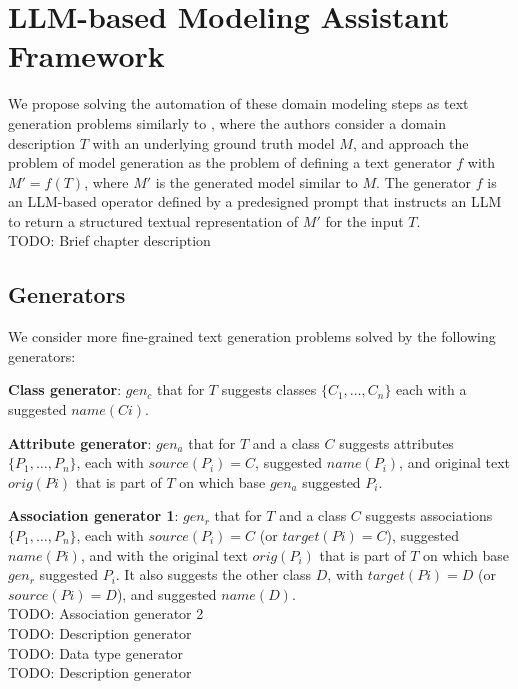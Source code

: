 \chapter{LLM-based Modeling Assistant Framework}

We propose solving the automation of these domain modeling steps as text generation problems similarly to \citet{Chen2023}, where the authors consider a domain description $T$ with an underlying ground truth model $M$, and approach the problem of model generation as the problem of defining a text generator $f$ with $M' = f(T)$, where $M'$ is the generated model similar to $M$. The generator $f$ is an LLM-based operator defined by a predesigned prompt that instructs an LLM to return a structured textual representation of $M'$ for the input $T$. \\

TODO: Brief chapter description


\section{Generators}

We consider more fine-grained text generation problems solved by the following generators:

\textbf{Class generator}: $gen_c$ that for $T$ suggests classes $\{C_1, \ldots, C_n\}$ each with a suggested $name(Ci)$.

\textbf{Attribute generator}: $gen_a$ that for $T$ and a class $C$ suggests attributes $\{P_1, \ldots, P_n\}$, each with $source(P_i) = C$, suggested $name(P_i)$, and original text $orig(Pi)$ that is part of $T$ on which base $gen_a$ suggested $P_i$.

\textbf{Association generator 1}: $gen_r$ that for $T$ and a class $C$ suggests associations $\{P_1, \ldots, P_n\}$, each with $source(P_i) = C$ (or $target(Pi) = C$), suggested $name(Pi)$, and with the original text $orig(P_i)$ that is part of $T$ on which base $gen_r$ suggested $P_i$. It also suggests the other class $D$, with $target(Pi)= D$ (or $source(Pi) = D$), and suggested $name(D)$. \\

TODO: Association generator 2 \\

TODO: Description generator \\

TODO: Data type generator \\

TODO: Description generator \\


